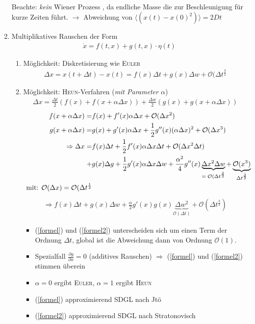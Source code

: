 \documentclass[12pt]{article}
\begin{document}
\begin{enumerate}
\begin{align*}
\end{align*}
Beachte: \textit{kein} Wiener Prozess , da endliche Masse die zur Beschleunigung für kurze Zeiten führt. $\to$ Abweichung von $\langle ( x(t) - x(0)^2) \rangle = 2Dt$
\item Multiplikatives Rauschen der Form 
\begin{align}
\dot{x}= f(t,x) + g(t,x) \cdot \eta (t) 
\end{align}
\begin{enumerate}
\item Möglichkeit: Diskretisierung wie \textsc{Euler}
\begin{align}
\Delta x = x(t + \Delta t) - x(t) = f(x) \Delta t + g(x) \Delta w + \mathcal{O}(\Delta t^\frac{3}{2} \label{formel}
\end{align}
\item Möglichkeit: \textsc{Heun}-Verfahren (\textit{mit Parameter $\alpha$})
\begin{align}
\Delta x = \frac{\Delta t}{2} \left( f(x) + f(x + \alpha \Delta x) \right)+  \frac{\Delta w}{2} \left( g(x) + g(x +\alpha \Delta x) \right)
\end{align}
\begin{align}
f(x + \alpha \Delta x ) =& f(x) + f'(x) \alpha \Delta x + \mathcal{O}(\Delta x^2) \\
g(x + \alpha \Delta x ) =& g(x) + g'(x) \alpha \Delta x + \frac{1}{2} g'' (x) (\alpha \Delta x)^2+ \mathcal{O}(\Delta x^3) \\
\Rightarrow \Delta x = & f(x) \Delta t + \frac{1}{2} f' (x) \alpha \Delta x \Delta t + \mathcal{O} (\Delta x^2 \Delta t) \\
+&
g(x) \Delta g + \frac{1}{2} g' (x) \alpha \Delta x \Delta w +\frac{\alpha^2}{4} g''(x) \underbrace{\Delta x^2 \Delta w}_\text{$ = \mathcal{O}(\Delta t^\frac{3}{2}$} + \underbrace{\mathcal{O} (x^3) }_\text{$ \Delta t^\frac{3}{2}$}
\\
 \mbox{ mit: } \mathcal{O}(\Delta x) = \mathcal{O}(\Delta t^{\frac{1}{2}}
\end{align}
\begin{align}
\Rightarrow f(x) \Delta t + g(x) \Delta w + \frac{\alpha}{2} g'(x) g(x) \underbrace{\Delta w^2}_\textbf{$\mathcal{O}(\Delta t)$} + \mathcal{O} (\Delta t^\frac{3}{2} ) \label{formel2}
\end{align}
\begin{itemize}
\item (\ref{formel}) und (\ref{formel2}) unterscheiden sich um einen Term der Ordnung $\Delta t$, global ist die Abweichung dann von Ordnung $\mathcal{O}(1)$.
\item Spezialfall $\frac{\partial g}{\partial x}=0$ (additives Rauschen) $\Rightarrow$ (\ref{formel}) und (\ref{formel2}) stimmen überein
\item $\alpha =0$ ergibt \textsc{Euler}, $\alpha=1$ ergibt \textsc{Heun}
\item (\ref{formel}) approximierend SDGL nach Jtö
\item (\ref{formel2}) approximierend SDGL nach Stratonovisch
\end{itemize}
\end{enumerate}
\end{enumerate}
\end{document}
